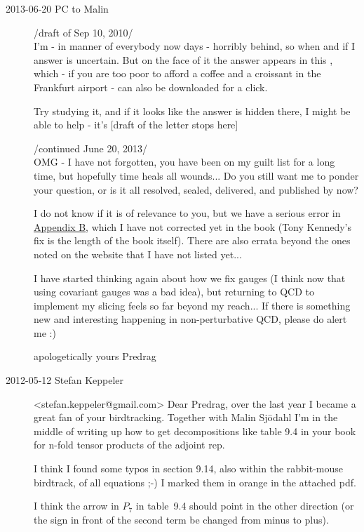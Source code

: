 \begin{description}
\item[2013-06-20 PC to Malin]

                           /draft of Sep 10, 2010/\\
I'm - in manner of everybody now days - horribly behind, so when and if I
answer is uncertain. But on the face of it the answer appears in this
, which - if you are too poor to
afford a coffee and a croissant in the Frankfurt airport - can also be
downloaded for a click.

Try studying it, and if it looks like the answer is hidden there, I might be
able to help - it's [draft of the letter stops here]

                          /continued June 20, 2013/\\
OMG - I have not forgotten, you have been on my guilt list for a long time,
but hopefully time heals all wounds... Do you still want me to ponder your
question, or is it all resolved, sealed, delivered, and published by now?

I do not know if it is of relevance to you, but we have a serious error in
\href{http://birdtracks.eu/extras/reviews.html}{Appendix B}, which I have not
corrected yet in the book (Tony Kennedy's fix is the length of the book
itself). There are also errata beyond the ones noted on the website that I
have not listed yet...

I have started thinking again about how we fix gauges (I think now that using
covariant gauges was a bad idea), but returning to QCD to implement my
slicing feels so far beyond my reach... If there is something new and
interesting happening in non-perturbative QCD, please do alert me :)

apologetically yours
Predrag


\item[2012-05-12 Stefan Keppeler] <stefan.keppeler@gmail.com>
Dear Predrag,
over the last year I became a great fan of your birdtracking. Together
with Malin Sj{\"o}dahl I'm in the middle of writing up how to get
decompositions like table 9.4 in your book for n-fold tensor products
of the adjoint rep.

I think I found some typos in section 9.14, also within the rabbit-mouse
birdtrack, of all equations ;-) I marked them in orange in the
 {attached pdf}.

I think the arrow in $P_7$ in table~9.4 should point in the other direction
(or the sign in front of the second term be changed from minus to plus).


\end{description}

